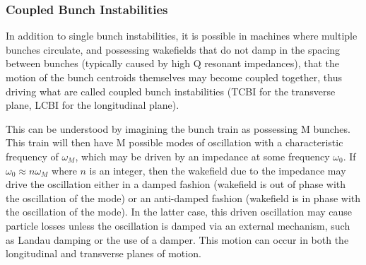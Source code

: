 \subsubsection{Coupled Bunch Instabilities}

In addition to single bunch instabilities, it is possible in machines where multiple bunches circulate, and possessing wakefields that do not damp in the spacing between bunches (typically caused by high Q resonant impedances), that the motion of the bunch centroids themselves may become coupled together, thus driving what are called coupled bunch instabilities (TCBI for the transverse plane, LCBI for the longitudinal plane). 

This can be understood by imagining the bunch train as possessing M bunches. This train will then have M possible modes of oscillation with a characteristic frequency of $\omega_{M}$, which may be driven by an impedance at some frequency $\omega_{0}$. If $\omega_{0} \approx n\omega_{M}$ where $n$ is an integer, then the wakefield due to the impedance may drive the oscillation either in a damped fashion (wakefield is out of phase with the oscillation of the mode) or an anti-damped fashion (wakefield is in phase with the oscillation of the mode). In the latter case, this driven oscillation may cause particle losses unless the oscillation is damped via an external mechanism, such as Landau damping or the use of a damper. This motion can occur in both the longitudinal and transverse planes of motion.

